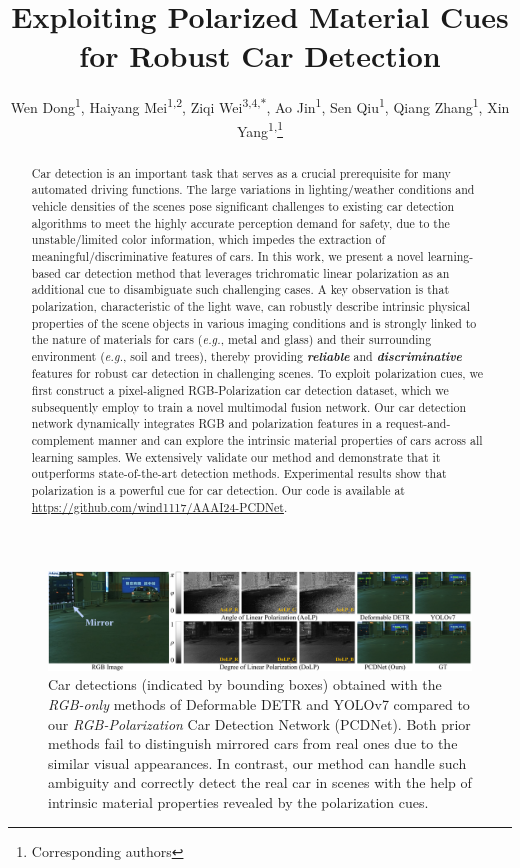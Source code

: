 \documentclass[letterpaper]{article} %
\title{Exploiting Polarized Material Cues for Robust Car Detection}
\author {
    Wen Dong\textsuperscript{\rm 1},
    Haiyang Mei\textsuperscript{\rm 1,2},
    Ziqi Wei\textsuperscript{\rm 3,4,$\ast$},
    Ao Jin\textsuperscript{\rm 1},
    Sen Qiu\textsuperscript{\rm 1},
    Qiang Zhang\textsuperscript{\rm 1},
    Xin Yang\textsuperscript{\rm 1,}\thanks{Corresponding authors}
}
\begin{document}
\maketitle

\begin{figure}[ht]
  \centering
  \includegraphics[width=\textwidth]{figure/teaser.pdf}
  \caption{Car detections (indicated by  bounding boxes) obtained with the \textit{RGB-only} methods of Deformable DETR \cite{zhu2020deformable} and YOLOv7 \cite{wang2022yolov7} compared to our \textit{RGB-Polarization} Car Detection Network (PCDNet). Both prior methods fail to distinguish mirrored cars from real ones due to the similar visual appearances. In contrast, our method can handle such ambiguity and correctly detect the real car in scenes with the help of intrinsic material properties revealed by the polarization cues.}
  \label{fig:teaser}
\end{figure}

\begin{abstract}
Car detection is an important task that serves as a crucial prerequisite for many automated driving functions. The large variations in lighting/weather conditions and vehicle densities of the scenes pose significant challenges to existing car detection algorithms to meet the highly accurate perception demand for safety, due to the unstable/limited color information, which impedes the extraction of meaningful/discriminative features of cars. In this work, we present a novel learning-based car detection method that leverages trichromatic linear polarization as an additional cue to disambiguate such challenging cases. A key observation is that polarization, characteristic of the light wave, can robustly describe intrinsic physical properties of the scene objects in various imaging conditions and is strongly linked to the nature of materials for cars (\textit{e.g.}, metal and glass) and their surrounding environment (\textit{e.g.}, soil and trees), thereby providing \textbf{\textit{reliable}} and \textbf{\textit{discriminative}} features for robust car detection in challenging scenes. To exploit polarization cues, we first construct a pixel-aligned RGB-Polarization car detection dataset, which we subsequently employ to train a novel multimodal fusion network. Our car detection network dynamically integrates RGB and polarization features in a request-and-complement manner and can explore the intrinsic material properties of cars across all learning samples. We extensively validate our method and demonstrate that it outperforms state-of-the-art detection methods. Experimental results show that polarization is a powerful cue for car detection. Our code is available at \url{https://github.com/wind1117/AAAI24-PCDNet}.
\end{abstract}
\end{document}
